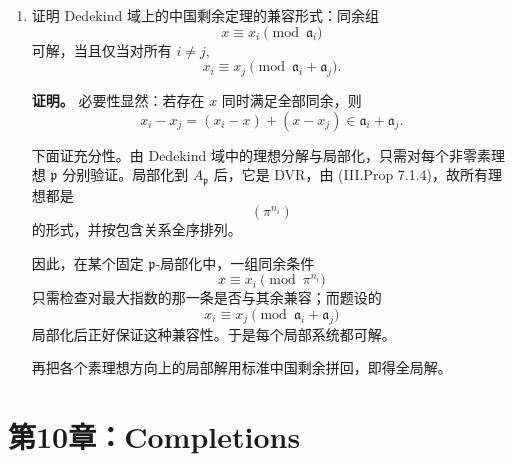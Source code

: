 \documentclass[a4paper]{ctexart}
\begin{document}
\begin{enumerate}[leftmargin=*, label=\textbf{9.\arabic*.}]
现取 \(A\) 中任意非零理想 \(\mathfrak b\)。取 \(0\neq a\in \mathfrak b\)。则 \(\mathfrak b/(a)\) 是 \(A/(a)\) 的理想，故主生成。设它由 \(\bar y\) 生成。于是 \(\mathfrak b\) 中每个元素模 \((a)\) 都是 \(\bar y\) 的倍数，即
\[
\mathfrak b=(a,y).
\]
故每个非零理想至多由两个元素生成。零理想显然由一个元素生成。

\setcounter{enumi}{8}
\item 证明 Dedekind 域上的中国剩余定理的兼容形式：同余组
\[
x\equiv x_i \pmod{\mathfrak a_i}
\]
可解，当且仅当对所有 \(i\ne j\),
\[
x_i\equiv x_j \pmod{\mathfrak a_i+\mathfrak a_j}.
\]

\textbf{证明。}
必要性显然：若存在 \(x\) 同时满足全部同余，则
\[
x_i-x_j=(x_i-x)+(x-x_j)\in \mathfrak a_i+\mathfrak a_j.
\]

下面证充分性。由 Dedekind 域中的理想分解与局部化，只需对每个非零素理想 \(\mathfrak p\) 分别验证。局部化到 \(A_{\mathfrak p}\) 后，它是 DVR，由 (III.Prop 7.1.4)，故所有理想都是
\[
(\pi^{n_i})
\]
的形式，并按包含关系全序排列。

因此，在某个固定 \(\mathfrak p\)-局部化中，一组同余条件
\[
x\equiv x_i \pmod{\pi^{n_i}}
\]
只需检查对最大指数的那一条是否与其余兼容；而题设的
\[
x_i\equiv x_j \pmod{\mathfrak a_i+\mathfrak a_j}
\]
局部化后正好保证这种兼容性。于是每个局部系统都可解。

再把各个素理想方向上的局部解用标准中国剩余拼回，即得全局解。
\end{enumerate}

\section{第10章：Completions}
\end{document}
